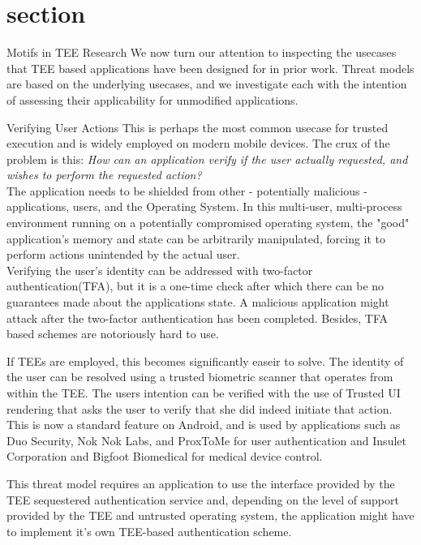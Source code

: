 \chapter{section}{Motifs in TEE Research}
\label{motifs}
We now turn our attention to inspecting the usecases that TEE based
applications have been designed for in prior work. Threat models are based
on the underlying usecases, and we investigate each with the intention of
assessing their applicability for unmodified applications. 
    
\begin{subsection}{Verifying User Actions}
This is perhaps the most common usecase for trusted execution and is widely
employed on modern mobile devices. The crux of the problem is this:
\emph{How can an application verify if the user actually requested, and
wishes to perform the requested action?} \\
The application needs to be shielded from other - potentially malicious -
applications, users, and the Operating System. In this multi-user,
multi-process environment running on a potentially compromised operating
system, the "good" application's memory and state can be arbitrarily
manipulated, forcing it to perform actions unintended by the actual user. \\
Verifying the user's identity can be addressed with two-factor
authentication(TFA), but it is a one-time check after which there can be no
guarantees  made about the applications state. A malicious application might
attack after the two-factor authentication has been completed. Besides, TFA
based schemes are notoriously hard to use\cite{herley2011research}. 

If TEEs are employed, this becomes significantly easeir to solve. The
identity of the user can be resolved using a trusted biometric scanner that
operates from within the TEE. The users intention can be verified with the
use of Trusted UI rendering that asks the user to verify that she did indeed
initiate that action. This is now a standard feature on
Android\cite{androiddevelopersblog_2018}, and is used by applications such
as Duo Security, Nok Nok Labs, and ProxToMe for user authentication and
Insulet Corporation and Bigfoot Biomedical for medical device
control\cite{androiddevelopersblog_2018}. 

This threat model requires an application to use the interface provided by
the TEE sequestered authentication service and, depending on the level of
support provided by the TEE and untrusted operating system, the application
might have to implement it's own TEE-based authentication
scheme\cite{liu2014veriui}. 

\end{subsection}

